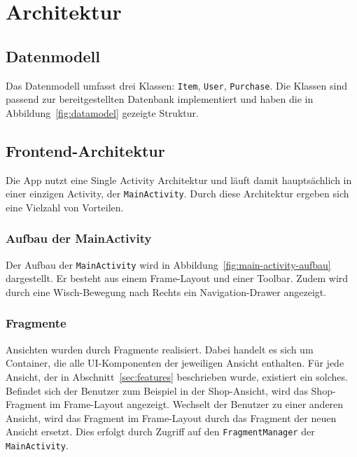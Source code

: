 \section{Architektur}\label{sec:architecture}

\subsection{Datenmodell}\label{subsec:datamodel}

Das Datenmodell umfasst drei Klassen: \texttt{Item}, \texttt{User}, \texttt{Purchase}.
Die Klassen sind passend zur bereitgestellten Datenbank implementiert und haben die in Abbildung~\ref{fig:datamodel} gezeigte Struktur.


\subsection{Frontend-Architektur}\label{subsec:frontend}

Die App nutzt eine Single Activity Architektur und läuft damit hauptsächlich in einer einzigen Activity, der \texttt{MainActivity}.
Durch diese Architektur ergeben sich eine Vielzahl von Vorteilen.

\subsubsection{Aufbau der MainActivity}

Der Aufbau der \texttt{MainActivity} wird in Abbildung~\ref{fig:main-activity-aufbau} dargestellt.
Er besteht aus einem Frame-Layout und einer Toolbar.
Zudem wird durch eine Wisch-Bewegung nach Rechts ein Navigation-Drawer angezeigt.

\subsubsection{Fragmente}

Ansichten wurden durch Fragmente realisiert.
Dabei handelt es sich um Container, die alle UI-Komponenten der jeweiligen Ansicht enthalten.
Für jede Ansicht, der in Abschnitt~\ref{sec:features} beschrieben wurde, existiert ein solches.
Befindet sich der Benutzer zum Beispiel in der Shop-Ansicht, wird das Shop-Fragment im Frame-Layout angezeigt.
Wechselt der Benutzer zu einer anderen Ansicht, wird das Fragment im Frame-Layout durch das Fragment der neuen Ansicht ersetzt.
Dies erfolgt durch Zugriff auf den \texttt{FragmentManager} der \texttt{MainActivity}.

